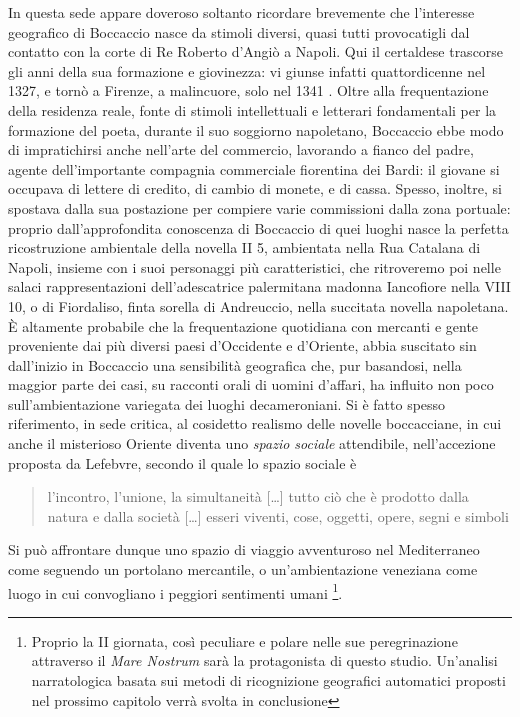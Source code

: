 In questa sede appare doveroso soltanto ricordare brevemente che
l'interesse geografico di Boccaccio nasce da stimoli diversi, quasi
tutti provocatigli dal contatto con la corte di Re Roberto d'Angiò a
Napoli. Qui il certaldese trascorse gli anni della sua formazione e
giovinezza: vi giunse infatti quattordicenne nel 1327, e tornò a
Firenze, a malincuore, solo nel 1341
\autocite[pp.~16-40]{branca1977giovanni}. Oltre alla frequentazione
della residenza reale, fonte di stimoli intellettuali e letterari
fondamentali per la formazione del poeta, durante il suo soggiorno
napoletano, Boccaccio ebbe modo di impratichirsi anche nell'arte del
commercio, lavorando a fianco del padre, agente dell'importante
compagnia commerciale fiorentina dei Bardi: il giovane si occupava di
lettere di credito, di cambio di monete, e di cassa. Spesso, inoltre, si
spostava dalla sua postazione per compiere varie commissioni dalla zona
portuale: proprio dall'approfondita conoscenza di Boccaccio di quei
luoghi nasce la perfetta ricostruzione ambientale della novella II 5,
ambientata nella Rua Catalana di Napoli, insieme con i suoi personaggi
più caratteristici, che ritroveremo poi nelle salaci rappresentazioni
dell'adescatrice palermitana madonna Iancofiore nella VIII 10, o di
Fiordaliso, finta sorella di Andreuccio, nella succitata novella
napoletana. È altamente probabile che la frequentazione quotidiana con
mercanti e gente proveniente dai più diversi paesi d'Occidente e
d'Oriente, abbia suscitato sin dall'inizio in Boccaccio una sensibilità
geografica che, pur basandosi, nella maggior parte dei casi, su racconti
orali di uomini d'affari, ha influito non poco sull'ambientazione
variegata dei luoghi decameroniani. Si è fatto spesso riferimento, in
sede critica, al cosidetto realismo delle novelle boccacciane, in cui
anche il misterioso Oriente diventa uno \emph{spazio sociale}
attendibile, nell'accezione proposta da Lefebvre, secondo il quale lo
spazio sociale è

\begin{quote}
l'incontro, l'unione, la simultaneità {[}\ldots{}{]} tutto ciò che è
prodotto dalla natura e dalla società {[}\ldots{}{]} esseri viventi,
cose, oggetti, opere, segni e simboli

\autocite[p.116]{lefebvre1978}
\end{quote}

Si può affrontare dunque uno spazio di viaggio avventuroso nel
Mediterraneo come seguendo un portolano mercantile, o un'ambientazione
veneziana come luogo in cui convogliano i peggiori sentimenti umani
\footnote{Proprio la II giornata, così peculiare e polare nelle sue
  peregrinazione attraverso il \emph{Mare Nostrum} sarà la protagonista
  di questo studio. Un'analisi narratologica basata sui metodi di
  ricognizione geografici automatici proposti nel prossimo capitolo
  verrà svolta in conclusione}.

